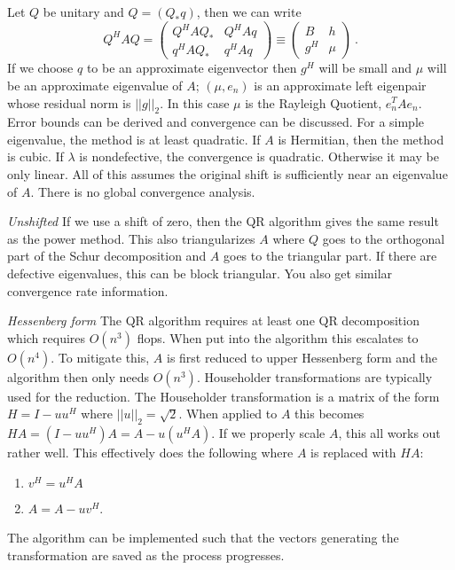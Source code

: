 \documentclass[12pt,twoside]{article}
\newcommand{\evalsl}{eigenvalues}
\newcommand{\eval}{eigenvalue }
\newcommand{\evec}{eigenvector }
\begin{document}
Let $Q$ be unitary and $Q = (Q_* q)$, then we can write
\begin{equation}
  Q^HAQ = \begin{pmatrix} Q^HAQ_* & Q^HAq \\ q^HAQ_* & q^HAq \end{pmatrix} \equiv 
          \begin{pmatrix}  B & h \\ g^H & \mu \end{pmatrix} \:.
\end{equation}
If we choose $q$ to be an approximate \evec then $g^H$ will be small and $\mu$ will be an approximate \eval of $A$; $(\mu, e_n)$ is an approximate left eigenpair whose residual norm is $||g||_2$. In this case $\mu$ is the Rayleigh Quotient, $e^T_n A e_n$. Error bounds can be derived and convergence can be discussed. For a simple eigenvalue, the method is at least quadratic. If $A$ is Hermitian, then the method is cubic. If $\lambda$ is nondefective, the convergence is quadratic. Otherwise it may be only linear. All of this assumes the original shift is sufficiently near an \eval of $A$. There is no global convergence analysis. 

\emph{Unshifted} If we use a shift of zero, then the QR algorithm gives the same result as the power method. This also triangularizes $A$ where $Q$ goes to the orthogonal part of the Schur decomposition and $A$ goes to the triangular part. If there are defective \evalsl, this can be block triangular. You also get similar convergence rate information. 

\emph{Hessenberg form}
The QR algorithm requires at least one QR decomposition which requires $O(n^3)$ flops. When put into the algorithm this escalates to $O(n^4)$. To mitigate this, $A$ is first reduced to upper Hessenberg form and the algorithm then only needs $O(n^3)$. Householder transformations are typically used for the reduction. The Householder transformation is a matrix of the form $H = I - u u^H$ where $||u||_2 = \sqrt{2}$. When applied to $A$ this becomes $HA = ( I - u u^H)A = A - u(u^H A)$. If we properly scale $A$, this all works out rather well. This effectively does the following where $A$ is replaced with $HA$:
\begin{enumerate}
  \item $v^H = u^H A$
  \item $A = A-uv^H$.
\end{enumerate}
The algorithm can be implemented such that the vectors generating the transformation are saved as the process progresses.
\end{document}
